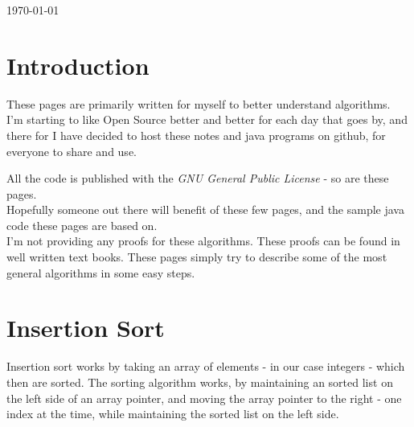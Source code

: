 \documentclass[12pt,a4paper]{article}
\begin{document}
\begin{titlepage}
{\large \today}\\[3cm] %



\vfill %

\end{titlepage}

\tableofcontents

\clearpage

\lstset{language=Java}
\lstset{frame=single}
\lstset{numbers=left}

\section{Introduction}
These pages are primarily written for myself to better understand algorithms.\\

I'm starting to like Open Source better and better for each day that goes by, and there for I have decided to host these notes and java programs on github, for everyone to share and use.

All the code is published with the \textit{GNU General Public License} - so are these pages.
\\

Hopefully someone out there will benefit of these few pages, and the sample java code these pages are based on.\\

I'm not providing any proofs for these algorithms. These proofs can be found in well written text books. These pages simply try to describe some of the most general algorithms in some easy steps.
\clearpage

\section{Insertion Sort}
Insertion sort works by taking an array of elements - in our case integers - which then are sorted.
The sorting algorithm works, by maintaining an sorted list on the left side of an array pointer, and moving the array pointer to the right - one index at the time, while maintaining the sorted list on the left side.
\end{document}
